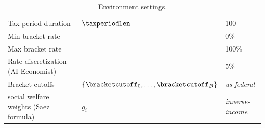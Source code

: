 \begin{table}[ht!]
\begin{small}
\begin{center}
\begin{tabular}[c]{lll}
                \hline

                Tax period duration & $\taxperiodlen$ & 100 \\
                Min bracket rate & & 0\% \\
                Max bracket rate & & 100\% \\
                Rate discretization (AI Economist) & & 5\% \\
                Bracket cutoffs & $\{\bracketcutoff_0, \ldots, \bracketcutoff_B\}$ & \textit{us-federal} \\
                social welfare weights (Saez formula) & $g_i$ & \textit{inverse-income} \\

                \end{tabular}
        \end{center}
        \caption{Environment settings.}
        \label{tab:env_settings_ai}
    \end{small}
\end{table}

